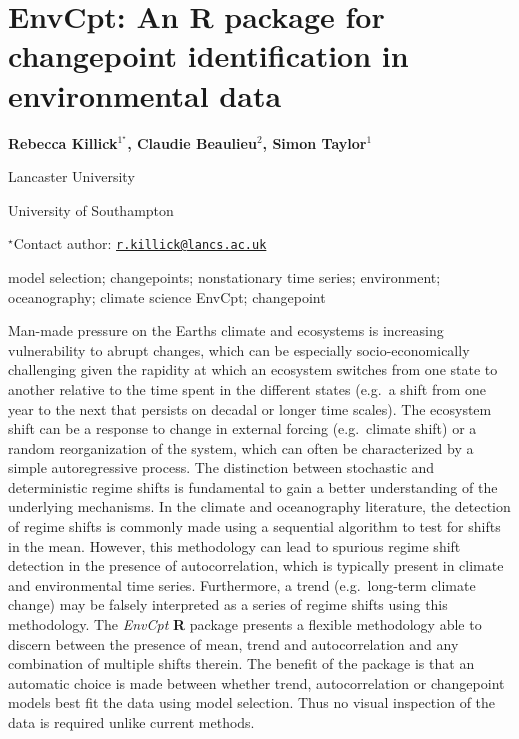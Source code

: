 \documentclass[\main/boa.tex]{subfiles}
\begin{document}
\section{EnvCpt: An R package for changepoint identification in environmental
data}

\begin{center}
  {\bf Rebecca Killick$^{1^\star}$, Claudie Beaulieu$^{2}$, Simon Taylor$^{1}$}
\end{center}

\vskip 0.3cm

\begin{affiliations}
\begin{enumerate}
\begin{minipage}{0.915\textwidth}
\centering
\item Lancaster University \\[-2pt]
\item University of Southampton \\[-2pt]
\end{minipage}
\end{enumerate}
$^\star$Contact author: \href{mailto:r.killick@lancs.ac.uk}{\nolinkurl{r.killick@lancs.ac.uk}}\\
\end{affiliations}

\vskip 0.5cm

\begin{minipage}{0.915\textwidth}
\keywords model selection; changepoints; nonstationary time series; environment;
oceanography; climate science
\packages EnvCpt; changepoint
\end{minipage}

\vskip 0.8cm

Man-made pressure on the Earths climate and ecosystems is increasing
vulnerability to abrupt changes, which can be especially
socio-economically challenging given the rapidity at which an ecosystem
switches from one state to another relative to the time spent in the
different states (e.g.~a shift from one year to the next that persists
on decadal or longer time scales). The ecosystem shift can be a response
to change in external forcing (e.g.~climate shift) or a random
reorganization of the system, which can often be characterized by a
simple autoregressive process. The distinction between stochastic and
deterministic regime shifts is fundamental to gain a better
understanding of the underlying mechanisms. In the climate and
oceanography literature, the detection of regime shifts is commonly made
using a sequential algorithm to test for shifts in the mean. However,
this methodology can lead to spurious regime shift detection in the
presence of autocorrelation, which is typically present in climate and
environmental time series. Furthermore, a trend (e.g.~long-term climate
change) may be falsely interpreted as a series of regime shifts using
this methodology. The \emph{EnvCpt} \textbf{R} package presents a
flexible methodology able to discern between the presence of mean, trend
and autocorrelation and any combination of multiple shifts therein. The
benefit of the package is that an automatic choice is made between
whether trend, autocorrelation or changepoint models best fit the data
using model selection. Thus no visual inspection of the data is required
unlike current methods.
\end{document}
